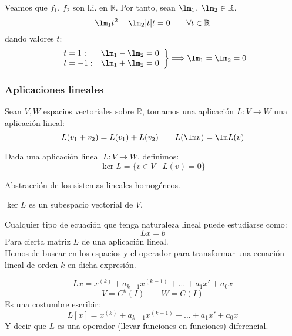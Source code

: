 \begin{ejemplo}
    Veamos que $f_1$, $f_2$ son l.i. en $\mathbb{R}$. Por tanto, sean $\lm_1$, $\lm_2 \in \mathbb{R}$.
    \begin{equation*}
        \lm_1 t^2 - \lm_2 |t| t = 0 \qquad \forall t\in \mathbb{R}
    \end{equation*}
    dando valores $t$:
    \begin{equation*}
        \left.\begin{array}{lr}
                t = 1: & \lm_1 - \lm_2 = 0 \\
                t = -1: &\lm_1 + \lm_2 = 0
        \end{array}\right\} \Longrightarrow \lm_1 = \lm_2 = 0
    \end{equation*}
\end{ejemplo}

\subsubsection{Aplicaciones lineales}
Sean $V,W$ espacios vectoriales sobre $\mathbb{R}$, tomamos una aplicación $L:V\rightarrow W$ una aplicación lineal:
\begin{equation*}
    L(v_1 + v_2) = L(v_1) + L(v_2) \qquad L(\lm v) = \lm L(v)
\end{equation*}

\begin{definicion}[Núcleo]
    Dada una aplicación lineal $L:V\rightarrow W$, definimos:
    \begin{equation*}
        \ker L = \{v\in V \mid L(v) = 0\}
    \end{equation*}
\end{definicion}
Abstracción de los sistemas lineales homogéneos.

\begin{prop}
    $\ker L$ es un subespacio vectorial de $V$.
\end{prop}

Cualquier tipo de ecuación que tenga naturaleza lineal puede estudiarse como:
\begin{equation*}
    Lx = b
\end{equation*}
Para cierta matriz $L$ de una aplicación lineal.\\

Hemos de buscar en los espacios y el operador para transformar una ecuación lineal de orden $k$ en dicha expresión.

\begin{equation*}
    Lx = x^{(k)} + a_{k-1}x^{(k-1)} + \ldots + a_1 x' + a_0 x
\end{equation*}
\begin{equation*}
    V = C^k(I) \qquad W = C(I)
\end{equation*}
Es una costumbre escribir:
\begin{equation*}
    L[x] = x^{(k)} + a_{k-1}x^{(k-1)} + \ldots + a_1 x' + a_0 x
\end{equation*}
Y decir que $L$ es una operador (llevar funciones en funciones) diferencial.

